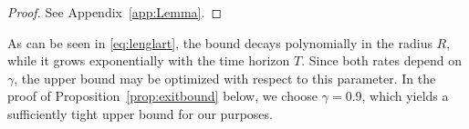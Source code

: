 \documentclass[11pt]{article}
\numberwithin{equation}{section}
\theoremstyle{plain}
\theoremstyle{definition}
\begin{document}
\begin{proof}
    See Appendix~\ref{app:Lemma}.
\end{proof}

As can be seen in \eqref{eq:lenglart}, the bound decays polynomially in the radius $R$, while it grows exponentially with the time horizon $T$. Since both rates depend on $\gamma$, the upper bound may be optimized with respect to this parameter. %
In the proof of Proposition~\ref{prop:exitbound} below, we choose $\gamma = 0.9$, which yields a sufficiently tight upper bound for our purposes.

   
\end{document}
